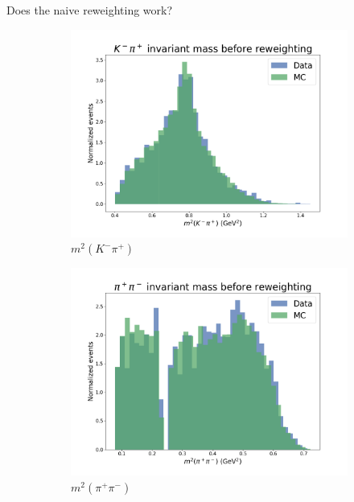 \documentclass{beamer}
\begin{document}
\begin{frame}{Does the naive reweighting work?}
\begin{figure}
\begin{subfigure}{0.33\textwidth}
      \includegraphics[width = 1.0\textwidth]{Plots/s12_DataMCMismatch_BeforeReweighting.png}
      \caption{$m^2(K^-\pi^+)$}
    \end{subfigure}
    \begin{subfigure}{0.33\textwidth}
      \includegraphics[width = 1.0\textwidth]{Plots/s23_DataMCMismatch_BeforeReweighting.png}
      \caption{$m^2(\pi^+\pi^-)$}
    \end{subfigure}%
    \begin{subfigure}{0.33\textwidth}

\end{subfigure}
\end{figure}
\end{frame}
\end{document}
